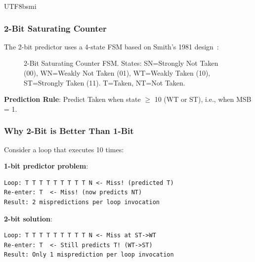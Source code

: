 \documentclass[journal,twoside]{IEEEtran}
\begin{document}
\begin{CJK}{UTF8}{bsmi}
\subsubsection{2-Bit Saturating Counter}
The 2-bit predictor uses a 4-state FSM based on Smith's 1981 design~\cite{smith1981study}:

\begin{figure}[!t]
\centering
{}
\caption{2-Bit Saturating Counter FSM. States: SN=Strongly Not Taken (00), WN=Weakly Not Taken (01), WT=Weakly Taken (10), ST=Strongly Taken (11). T=Taken, NT=Not Taken.}
\label{fig:bp}
\end{figure}

\textbf{Prediction Rule}: Predict Taken when state $\geq$ 10 (WT or ST), i.e., when MSB = 1.

\subsubsection{Why 2-Bit is Better Than 1-Bit}
Consider a loop that executes 10 times:

\textbf{1-bit predictor problem}:
\begin{lstlisting}
Loop: T T T T T T T T T N <- Miss! (predicted T)
Re-enter: T  <- Miss! (now predicts NT)
Result: 2 mispredictions per loop invocation
\end{lstlisting}

\textbf{2-bit solution}:
\begin{lstlisting}
Loop: T T T T T T T T T N <- Miss at ST->WT
Re-enter: T  <- Still predicts T! (WT->ST)
Result: Only 1 misprediction per loop invocation
\end{lstlisting}


\end{CJK}
\end{document}
